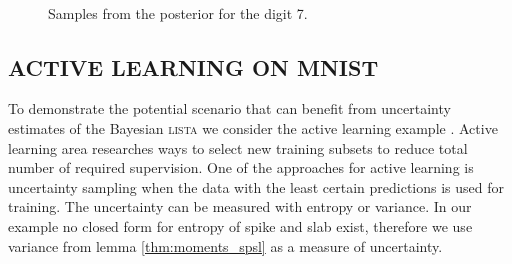 \documentclass[letterpaper]{article}
\begin{document}
\begin{figure}[t]
~
~
\caption{Samples from the posterior for the digit 7.}
\label{fig:posterior_samples}
\end{figure}

\subsection{\uppercase{Active learning on mnist}}
To demonstrate the potential scenario that can benefit from uncertainty estimates of the Bayesian \textsc{lista} we consider the active learning example \citep{settles.tr09}. Active learning area researches ways to select new training subsets to reduce total number of required supervision. One of the approaches for active learning is uncertainty sampling when the data with the least certain predictions is used for training. The uncertainty can be measured with entropy or variance. In our example no closed form for entropy of spike and slab exist, therefore we use variance from lemma \ref{thm:moments_spsl} as a measure of uncertainty.
\end{document}
